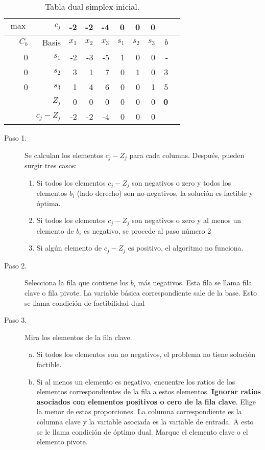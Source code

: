 \documentclass[letter]{article}
\begin{document}
\begin{table}[h]
\caption{Tabla dual simplex inicial.}
      \centering
      \begin{tabular}{rrrrrrrrrr}
        \toprule
        $\max$&$c_j$&-2&-2&-4&0&0&0&\\
        \midrule
        $C_b$&Basis&$x_1$&$x_2$&$x_3$&$s_1$&$s_2$&$s_3$&$b$&\\
        \midrule
        0&\color{blue}$s_1$&-2&-3&-5&1&0&0&-& \\
        0&$s_2$&3&1&7&0&1&0&3&\\
        0&$s_3$&1&4&6&0&0&1&5&\\
        \midrule
              &$Z_j$&0&0&0&0&0&0&\cellcolor{yellow}\textbf{0}&\\
              &$c_j - Z_j$&-2&-2&-4&0&0&0&\\
        \bottomrule
      \end{tabular}
    \end{table}
    


    \begin{description}
    \item[Paso 1.] Se calculan los elementos $c_j - Z_j$ para cada columns. Después, pueden surgir tres casos:
  \begin{enumerate}  
  \item  Si todos los elementos $c_j - Z_j$ son negativos o zero y todos los elementos $b_i$ (lado derecho) son no-negativos, la solución es factible y óptima.
\item Si todos los elementos $c_j - Z_j$ son negativos o zero y al menos un elemento de $b_i$ es negativo, se procede al paso número 2
\item  Si algún elemento de $c_j - Z_j$ es positivo, el algoritmo no funciona.
  \end{enumerate}
\item[Paso 2.] Selecciona la fila que contiene los $b_i$ más negativos. Esta fila se llama fila clave o fila pivote. La variable básica correspondiente sale de la base. Esto se llama condición de factibilidad dual
\item[Paso 3.]  Mira los elementos de la fila clave.
  \begin{enumerate}[a)]
  \item  Si todos los elementos son no negativos, el problema no tiene solución factible.
  \item  Si al menos un elemento es negativo, encuentre los ratios de los elementos correspondientes de la fila a estos elementos. \textbf{Ignorar ratios asociados con elementos positivos o cero de la fila clave}. Elige la menor de estas proporciones. La columna correspondiente es la columna clave y la variable asociada es la variable de entrada. A esto se le llama condición de óptimo dual. Marque el elemento clave o el elemento pivote.
  \end{enumerate}
\end{description}
\end{document}
